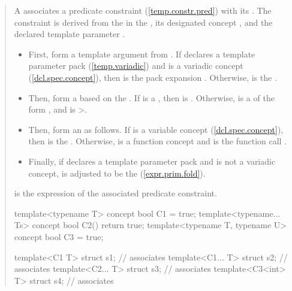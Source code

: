 \begin{quote}
\begin{addedblock}
\pnum
A  associates a predicate
constraint (\ref{temp.constr.pred}) with its . 
% 
The constraint is derived from the  
 in the , its designated concept 
, and the declared template parameter .
% 
\begin{itemize}
\item First, form a template argument  from . If  
declares a template parameter pack (\ref{temp.variadic})
and  is a variadic concept (\ref{dcl.spec.concept}), then  is 
the pack expansion . Otherwise,  is the 
 .

\item Then, form a   based on the 
 . If  is 
a , then  is . Otherwise, 
 is a  of the form
, and  is >.

\item Then, form an   as follows. 
If  is a variable concept (\ref{dcl.spec.concept}), then  is the 
 . Otherwise,  is a function 
concept and  is the function call .

\item Finally, if  declares a template parameter pack and 
 is not a variadic concept,  is adjusted to be the
  (\ref{expr.prim.fold}).
\end{itemize}
% 
 is the expression of the associated predicate constraint.
% 
\enterexample
\begin{codeblock}
template<typename T> concept bool C1 = true;
template<typename... Ts> concept bool C2() { return true; }
template<typename T, typename U> concept bool C3 = true;

template<C1 T> struct s1;      // associates 
template<C1... T> struct s2;   // associates 
template<C2... T> struct s3;   // associates 
template<C3<int> T> struct s4; // associates 
\end{codeblock}
\exitexample
\end{addedblock}
\end{quote}

